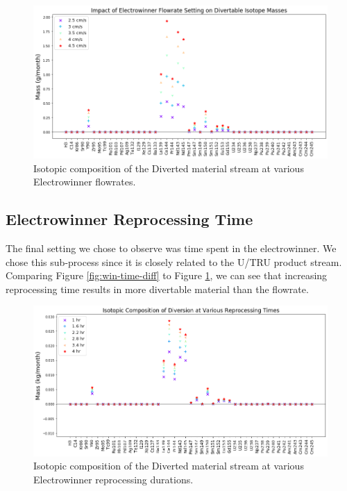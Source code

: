 \begin{figure}
	\includegraphics[width=\linewidth]{images/flowrate-sa-diff}
	\caption{Isotopic composition of the Diverted material stream at various Electrowinner flowrates.}
	\label{fig:win-flow-diff}
\end{figure}

\subsection{Electrowinner Reprocessing Time}

The final setting we chose to observe was time spent in the electrowinner. We chose this sub-process since it is closely related to the U/TRU product stream. Comparing Figure \ref{fig:win-time-diff} to Figure \ref{fig:win-flow-diff}, we can see that increasing 
reprocessing time results in more divertable material than the flowrate. 

\begin{figure}
	\includegraphics[width=\linewidth]{images/time-sa-comp}
	\caption{Isotopic composition of the Diverted material stream at various Electrowinner reprocessing durations.}
	\label{fig:win-time-sa}
\end{figure}

